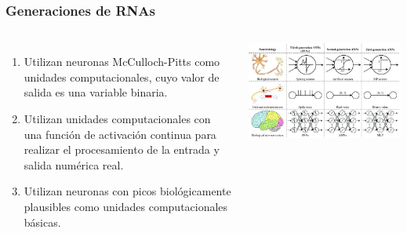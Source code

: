 \frame
{
  \frametitle{Generaciones de RNAs \cite{WANG2020258}}
  \begin{columns}
  \begin{enumerate}
 \item Utilizan neuronas McCulloch-Pitts como unidades computacionales, cuyo valor de salida es una variable binaria. 
 \item Utilizan unidades computacionales con una función de activación continua para realizar el procesamiento de la entrada y salida numérica real.
 \item Utilizan neuronas con picos biológicamente plausibles como unidades computacionales básicas.
  \end{enumerate}
   

    \includegraphics[width=\textwidth]{Figs/GeneracionesRNAs}	
  \end{columns}
}



